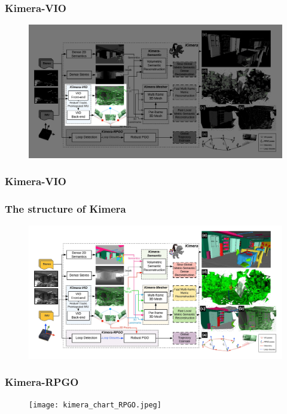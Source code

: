 \documentclass[11pt]{beamer}
\begin{document}
\begin{frame}
\frametitle{Kimera-VIO}
\begin{figure}
    \includegraphics[width=\linewidth]{kimera_chart_VIO.jpeg} 
\end{figure}
\end{frame}
\begin{frame}
    \frametitle{Kimera-VIO} 
    \begin{figure}[ht]
        \centering
    \end{figure}
\end{frame}
\begin{frame}
\frametitle{The structure of Kimera}
\begin{figure}
    \includegraphics[width=\linewidth]{kimera_chart_23.jpeg} 
\end{figure}
\end{frame}
\begin{frame}
    \frametitle{Kimera-RPGO} 
\begin{figure}
    \texttt{[image: kimera\_chart\_RPGO.jpeg]} 
\end{figure}
\end{frame}
\end{document}
